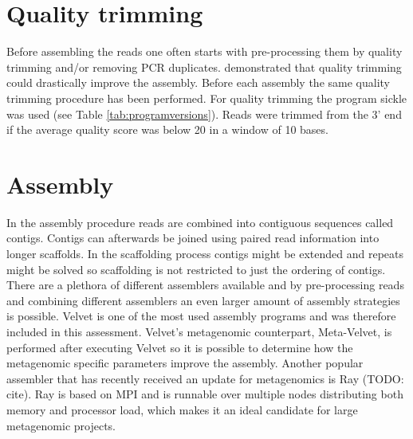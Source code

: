 \documentclass[a4paper,12pt]{report}
\begin{document}

\section{Quality trimming} Before assembling the reads one often starts with
pre-processing them by quality trimming and/or removing PCR duplicates.
\citet{Mende22384016} demonstrated that quality trimming could drastically
improve the assembly. Before each assembly the same quality trimming procedure
has been performed. For quality trimming the program sickle was used (see Table
\ref{tab:programversions}). Reads were trimmed from the 3' end if the average
quality score was below 20 in a window of 10 bases.


\section{Assembly} In the assembly procedure reads are combined into
contiguous sequences called contigs. Contigs can afterwards be joined using
paired read information into longer scaffolds. In the scaffolding process
contigs might be extended and repeats might be solved so scaffolding is not
restricted to just the ordering of contigs.\\


There are a plethora of different assemblers available and by pre-processing
reads and combining different assemblers an even larger amount of assembly
strategies is possible. Velvet is one of the most used assembly programs and
was therefore included in this assessment. Velvet's metagenomic counterpart,
Meta-Velvet, is performed after executing Velvet so it is possible to determine
how the metagenomic specific parameters improve the assembly. Another popular
assembler that has recently received an update for metagenomics is Ray (TODO:
cite). Ray is based on MPI and is runnable over multiple nodes distributing
both memory and processor load, which makes it an ideal candidate for large
metagenomic projects.\\
\end{document}
